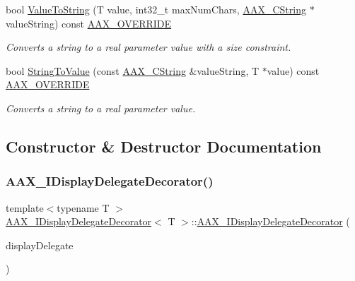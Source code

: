 \begin{DoxyCompactItemize}
bool \mbox{\hyperlink{a01805_a29a49bb21a08c1c1e59758b08396d0a4}{Value\+To\+String}} (T value, int32\+\_\+t max\+Num\+Chars, \mbox{\hyperlink{a01573}{A\+A\+X\+\_\+\+C\+String}} $\ast$value\+String) const \mbox{\hyperlink{a00392_ac2f24a5172689ae684344abdcce55463}{A\+A\+X\+\_\+\+O\+V\+E\+R\+R\+I\+DE}}
\begin{DoxyCompactList}\small\item\em Converts a string to a real parameter value with a size constraint. \end{DoxyCompactList}\item 
bool \mbox{\hyperlink{a01805_a18d19293f3eca619cb5bb7f1ffde1a8d}{String\+To\+Value}} (const \mbox{\hyperlink{a01573}{A\+A\+X\+\_\+\+C\+String}} \&value\+String, T $\ast$value) const \mbox{\hyperlink{a00392_ac2f24a5172689ae684344abdcce55463}{A\+A\+X\+\_\+\+O\+V\+E\+R\+R\+I\+DE}}
\begin{DoxyCompactList}\small\item\em Converts a string to a real parameter value. \end{DoxyCompactList}\end{DoxyCompactItemize}


\subsection{Constructor \& Destructor Documentation}
\mbox{\label{a01805_a1e103af1eaeb6530317db4e41843c166}} 
\subsubsection{\texorpdfstring{AAX\_IDisplayDelegateDecorator()}{AAX\_IDisplayDelegateDecorator()}\hspace{0.1cm}{\footnotesize\ttfamily [1/2]}}
{\footnotesize\ttfamily template$<$typename T $>$ \\
\mbox{\hyperlink{a01805}{A\+A\+X\+\_\+\+I\+Display\+Delegate\+Decorator}}$<$ T $>$\+::\mbox{\hyperlink{a01805}{A\+A\+X\+\_\+\+I\+Display\+Delegate\+Decorator}} (\begin{DoxyParamCaption}\item[{const \mbox{\hyperlink{a01801}{A\+A\+X\+\_\+\+I\+Display\+Delegate}}$<$ T $>$ \&}]{display\+Delegate }\end{DoxyParamCaption})}



